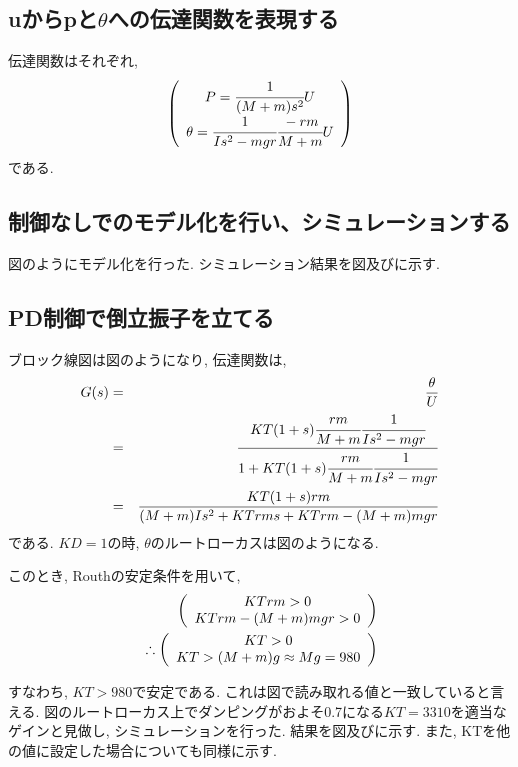 \documentclass[12pt]{jsarticle}   	%
\begin{document}
\subsection{uからpと$\theta$への伝達関数を表現する}
\noindent
伝達関数はそれぞれ, 
\begin{eqnarray}
\left(
\begin{array}{c}
P=\cfrac{1}{(M+m)s^2}U\\
\theta = \cfrac{1}{Is^2-mgr}\cfrac{-rm}{M+m}U
\end{array}
\right)
\end{eqnarray}
である.

\subsection{制御なしでのモデル化を行い、シミュレーションする}
\noindent
図のようにモデル化を行った.
シミュレーション結果を図及びに示す.
\subsection{PD制御で倒立振子を立てる}
\noindent
ブロック線図は図のようになり, 伝達関数は, 
\begin{eqnarray}
G(s) &=& \frac{\theta}{U} \\
&=&\frac{KT(1+s)\cfrac{rm}{M+m}\cfrac{1}{Is^2-mgr}} {1+KT(1+s)\cfrac{rm}{M+m}\cfrac{1}{Is^2-mgr}} \\
&=& \frac{KT(1+s)rm}{(M+m)Is^2+KTrms+KTrm-(M+m)mgr}
\end{eqnarray}
である. $KD=1$の時, $\theta$のルートローカスは図のようになる. 

\noindent
このとき, Routhの安定条件を用いて, 
\begin{eqnarray}
\left(
\begin{array}{c}
KTrm>0\\
KTrm-(M+m)mgr>0
\end{array}
\right)\\
\newline
\therefore \left(
\begin{array}{c}
KT>0\\
KT>(M+m)g\approx Mg=980
\end{array}
\right)
\end{eqnarray}

\noindent
すなわち, $KT>980$で安定である. これは図で読み取れる値と一致していると言える. 
図のルートローカス上でダンピングがおよそ0.7になる$KT=3310$を適当なゲインと見做し, シミュレーションを行った. 結果を図及びに示す. 
また, KTを他の値に設定した場合についても同様に示す.
\end{document}
